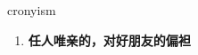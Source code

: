
\begin{frame}
{\huge cronyism}
\begin{center}
\begin{enumerate}\Large
  \item \textbf{任人唯亲的，对好朋友的偏袒}
\end{enumerate}
\end{center}
\end{frame}
